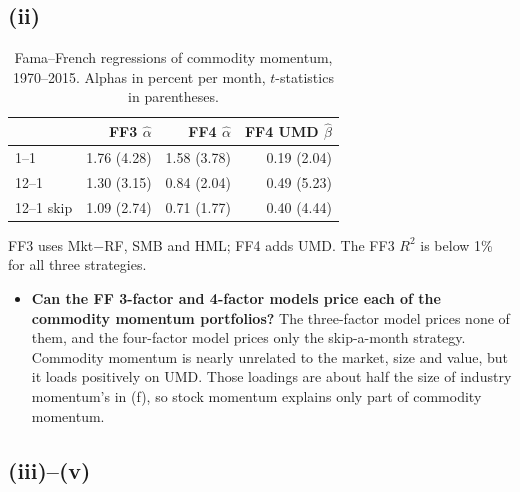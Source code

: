 \documentclass[11pt]{article}
\begin{document}
\subsection*{(ii)}

\begin{table}[H]
\centering
\caption{Fama--French regressions of commodity momentum, 1970--2015. Alphas in percent per month, $t$-statistics in parentheses.}
\small
\begin{tabular}{lrrr}
\toprule
& FF3 $\hat\alpha$ & FF4 $\hat\alpha$ & FF4 UMD $\hat\beta$ \\
\midrule
1--1 & 1.76 (4.28) & 1.58 (3.78) & 0.19 (2.04) \\
12--1 & 1.30 (3.15) & 0.84 (2.04) & 0.49 (5.23) \\
12--1 skip & 1.09 (2.74) & 0.71 (1.77) & 0.40 (4.44) \\
\bottomrule
\end{tabular}
\vspace{2pt}\begin{minipage}{0.75\textwidth}\footnotesize
FF3 uses Mkt$-$RF, SMB and HML; FF4 adds UMD. The FF3 $R^2$ is below 1\% for all three strategies.
\end{minipage}
\end{table}

\begin{itemize}
\setlength{\itemsep}{4pt}\setlength{\parskip}{0pt}

\item \textbf{Can the FF 3-factor and 4-factor models price each of the commodity momentum portfolios?} The three-factor model prices none of them, and the four-factor model prices only the skip-a-month strategy. Commodity momentum is nearly unrelated to the market, size and value, but it loads positively on UMD. Those loadings are about half the size of industry momentum's in (f), so stock momentum explains only part of commodity momentum.

\end{itemize}

\subsection*{(iii)--(v)}
\end{document}
